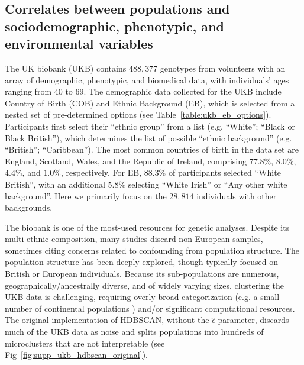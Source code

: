 \subsection{Correlates between populations and sociodemographic, phenotypic, and environmental variables}
The UK biobank (UKB) contains $488,377$ genotypes from volunteers with an array of demographic, phenotypic, and biomedical data, with individuals' ages ranging from $40$ to $69$. The demographic data collected for the UKB include Country of Birth (COB) and Ethnic Background (EB), which is selected from a nested set of pre-determined options (see Table~\ref{table:ukb_eb_options}). Participants first select their ``ethnic group'' from a list (e.g. ``White''; ``Black or Black British''), which determines the list of possible ``ethnic background'' (e.g. ``British''; ``Caribbean''). The most common countries of birth in the data set are England, Scotland, Wales, and the Republic of Ireland, comprising $77.8\%$, $8.0\%$, $4.4\%$, and $1.0\%$,  respectively. For EB, $88.3\%$ of participants selected ``White British'', with an additional $5.8\%$ selecting ``White Irish'' or ``Any other white background''. Here we primarily focus on the $28,814$ individuals with other backgrounds.

The biobank is one of the most-used resources for genetic analyses. Despite its multi-ethnic composition, many studies discard non-European samples, sometimes citing concerns related to confounding from population structure\citep{ben-eghan_dont_2020}. The population structure has been deeply explored, though typically focused on British or European individuals\citep{abdellaoui_genetic_2019,gilbert_revealing_2022,chiu_inferring_2022}. Because its sub-populations are numerous, geographically/ancestrally diverse, and of widely varying sizes, clustering the UKB data is challenging, requiring overly broad categorization (e.g. a small number of continental populations \citep{halldorsson_sequences_2022,nagar_socioeconomic_2021}) and/or significant computational resources. The original implementation of HDBSCAN, without the $\hat{\epsilon}$ parameter, discards much of the UKB data as noise and splits populations into hundreds of microclusters that are not interpretable (see Fig~\ref{fig:supp_ukb_hdbscan_original}).

